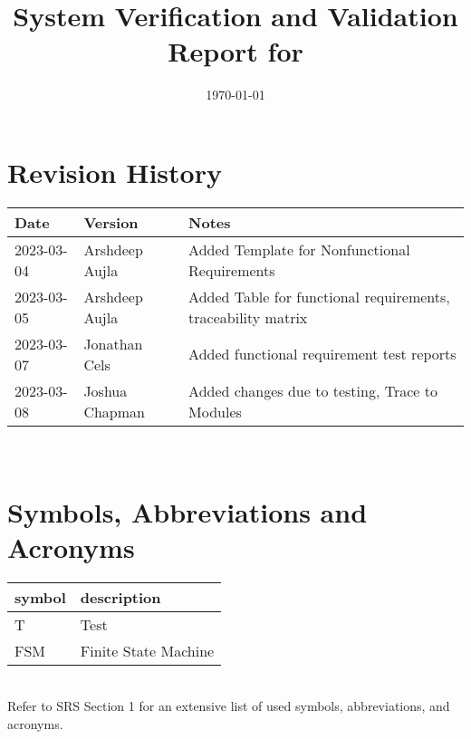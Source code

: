 \documentclass[12pt, titlepage]{article}
\begin{document}
\title{System Verification and Validation Report for \progname{}} 
\author{\authname}
\date{\today}
	
\maketitle


\section{Revision History}

\begin{tabularx}{\textwidth}{p{3cm}p{2cm}X}
\toprule {\bf Date} & {\bf Version} & {\bf Notes}\\
\midrule
2023-03-04 & Arshdeep Aujla & Added Template for Nonfunctional Requirements\\
2023-03-05 & Arshdeep Aujla & Added Table for functional requirements, traceability matrix\\
2023-03-07 & Jonathan Cels & Added functional requirement test reports\\
2023-03-08 & Joshua Chapman & Added changes due to testing, Trace to Modules\\
\bottomrule
\end{tabularx}

~\newpage

\section{Symbols, Abbreviations and Acronyms}

\renewcommand{\arraystretch}{1.2}
\begin{tabular}{l l} 
  \toprule		
  \textbf{symbol} & \textbf{description}\\
  \midrule 
  T & Test\\
  FSM & Finite State Machine\\
  \bottomrule
\end{tabular}\\

Refer to SRS Section 1 for an extensive list of used symbols, abbreviations, and acronyms.

\newpage

\tableofcontents

\listoftables %

\listoffigures %

\newpage
\end{document}
